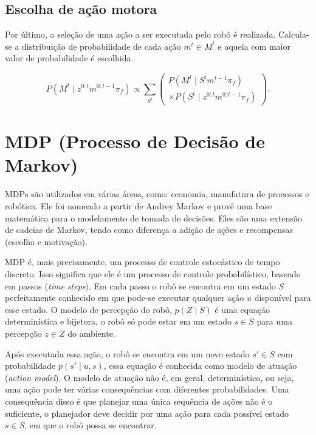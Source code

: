 \subsection{Escolha de ação motora}

Por último, a seleção de uma ação a ser executada pelo robô é realizada. Calcula-se a distribuição de probabilidade de cada ação $ m^t \in M^t $ e aquela com maior valor de probabilidade é escolhida.

\begin{equation}
    P \left( M^t \mid z^{0: t} m^{0: t-1} \pi_f \right) \propto \sum\limits_{S^t}
        \left(
            \begin{array}{l}
                P \left( M^t \mid S^t m^{t-1} \pi_f \right)\\
                \times P \left( S^t \mid z^{0: t} m^{0: t-1} \pi_f \right)
            \end{array}
        \right).
\end{equation}


\section{MDP (Processo de Decisão de Markov)} \label{section:MDP}

MDPs são utilizados em várias áreas, como: economia, manufatura de processos e robótica. Ele foi nomeado a partir de Andrey Markov e provê uma base matemática para o modelamento de tomada de decisões. Eles são uma extensão de cadeias de Markov, tendo como diferença a adição de ações e recompensas (escolha e motivação).

MDP é, mais precisamente, um processo de controle estocástico de tempo discreto. Isso significa que ele é um processo de controle probabilístico, baseado em passos (\textit{time steps}). Em cada passo o robô se encontra em um estado $ S $ perfeitamente conhecido em que pode-se executar qualquer ação $ u $ disponível para esse estado. O modelo de percepção do robô, $ p \left( Z \mid S \right) $ é uma equação determinística e bijetora, o robô só pode estar em um estado $ s \in S $ para uma percepção $ z \in Z $ do ambiente.

Após executada essa ação, o robô se encontra em um novo estado $ s' \in S $ com probabilidade $ p \left( s' \mid u, s \right) $, essa equação é conhecida como modelo de atuação (\textit{action model}). O modelo de atuação não é, em geral, determinístico, ou seja, uma ação pode ter várias consequências com diferentes probabilidades. Uma consequência disso é que planejar uma única sequência de ações não é o suficiente, o planejador deve decidir por uma ação para cada possível estado $ s \in S $, em que o robô possa se encontrar.

